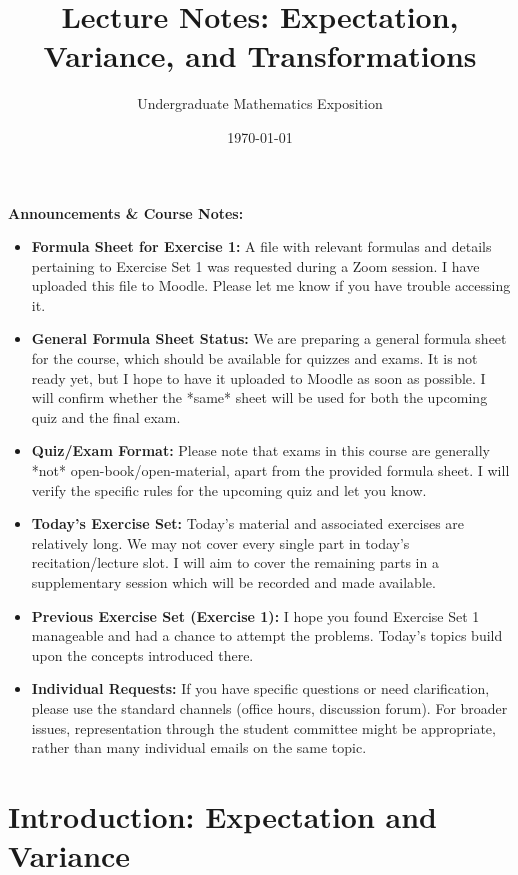 \documentclass[11pt, letterpaper]{article}
\title{Lecture Notes: Expectation, Variance, and Transformations}
\author{Undergraduate Mathematics Exposition} %
\date{\today} %
\theoremstyle{plain} %
\theoremstyle{definition} %
\theoremstyle{remark} %
\newenvironment{announcement}
  {\begin{framed}\noindent\textbf{Announcements \& Course Notes:}\par\medskip\begin{itemize}}
  {\end{itemize}\end{framed}}
\begin{document}
\maketitle

\begin{announcement}
    \item \textbf{Formula Sheet for Exercise 1:} A file with relevant formulas and details pertaining to Exercise Set 1 was requested during a Zoom session. I have uploaded this file to Moodle. Please let me know if you have trouble accessing it.
    \item \textbf{General Formula Sheet Status:} We are preparing a general formula sheet for the course, which should be available for quizzes and exams. It is not ready yet, but I hope to have it uploaded to Moodle as soon as possible. I will confirm whether the *same* sheet will be used for both the upcoming quiz and the final exam.
    \item \textbf{Quiz/Exam Format:} Please note that exams in this course are generally *not* open-book/open-material, apart from the provided formula sheet. I will verify the specific rules for the upcoming quiz and let you know.
    \item \textbf{Today's Exercise Set:} Today's material and associated exercises are relatively long. We may not cover every single part in today's recitation/lecture slot. I will aim to cover the remaining parts in a supplementary session which will be recorded and made available.
    \item \textbf{Previous Exercise Set (Exercise 1):} I hope you found Exercise Set 1 manageable and had a chance to attempt the problems. Today's topics build upon the concepts introduced there.
    \item \textbf{Individual Requests:} If you have specific questions or need clarification, please use the standard channels (office hours, discussion forum). For broader issues, representation through the student committee might be appropriate, rather than many individual emails on the same topic.
\end{announcement}


\section{Introduction: Expectation and Variance}
\end{document}
